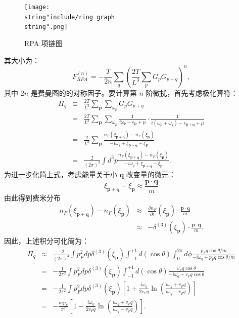 \documentclass[10pt,UTF8]{ctexart}
\begin{document}
\begin{figure}[H]
\begin{centering}
\texttt{[image: \\string"include/ring graph\\string".png]}
\par\end{centering}
\centering{}\caption{RPA 项链图}
\end{figure}
\noindent
其大小为：
\begin{equation}
	F_{RPA}^{\left(n\right)}=-\frac{T}{2n}\sum_{q}\left(\frac{2T}{L^{3}}\sum_{p} G_p G_{p+q} \right)^n,
\end{equation}
其中 $2n$ 是费曼图的的对称因子。要计算第 $n$ 阶微扰，首先考虑极化算符：
\begin{eqnarray}
	\Pi_{q} & \equiv & \frac{2T}{L^{3}}\sum_{\bm{p}}\sum_{\omega_{p}}G_{p}G_{p+q}\\
 	& = & \frac{2T}{L^{3}}\sum_{\bm{p}}\sum_{\omega_{p}}\frac{1}{i\omega_{p}-\epsilon_{\bm{p}}+\mu}\cdot\frac{1}{i\left(\omega_{p}+\omega_{q}\right)-\epsilon_{\bm{p}+\bm{q}}+\mu}\\
 	& = & \frac{2}{L^{3}}\sum_{\bm{p}}\frac{n_{F}\left(\xi_{\bm{p}+\bm{q}}\right)-n_{F}\left(\xi_{\bm{p}}\right)}{-i\omega_{q}+\xi_{\bm{p}+\bm{q}}-\xi_{\bm{p}}}\\
 	& = & \frac{2}{\left(2\pi\right)^{3}}\int d^{3}p\frac{n_{F}\left(\xi_{\bm{p}+\bm{q}}\right)-n_{F}\left(\xi_{\bm{p}}\right)}{-i\omega_{q}+\xi_{\bm{p}+\bm{q}}-\xi_{\bm{p}}}.
\end{eqnarray}
为进一步化简上式，考虑能量关于小 $\bm q$ 改变量的微元：
\begin{equation}
	\xi_{\bm{p}+\bm{q}}-\xi_{\bm{p}} \approx \frac{\bm{p}\cdot\bm{q}}{m}
\end{equation}
由此得到费米分布
\begin{eqnarray}
	n_{F}\left(\xi_{\bm{p}+\bm{q}}\right)-n_{F}\left(\xi_{\bm{p}}\right) 
	& \approx & \frac{\partial n_{F}}{\partial\epsilon}\left(\xi_{\bm{p}}\right)\cdot\frac{\bm{p}\cdot\bm{q}}{m}\\
 	& \approx & -\delta^{\left(3\right)}\left(\xi_{\bm p}\right)\cdot\frac{\bm{p}\cdot\bm{q}}{m}.
\end{eqnarray}
因此，上述积分可化简为：
\begin{eqnarray}
	\Pi_{q} & \approx & \frac{-2}{\left(2\pi\right)^{3}}\int p_{F}^{2}dp\delta^{(3)}(\xi_{\bm p})\int_{-1}^{+1}d\left(\cos\theta\right)\int_{0}^{2\pi}d\phi\frac{p_{F}q\cos\theta/m}{-i\omega_{q}+p_{F}q\cos\theta/m}\\
 	& = & -\frac{1}{2\pi^{2}}\int p_{F}^{2}dp\delta^{(3)}(\xi_{\bm p})\int_{-1}^{+1}d\left(\cos\theta\right)\frac{v_{F}q\cos\theta}{-i\omega_{q}+v_{F}q\cos\theta}\\
 	& = & -\frac{1}{2\pi^{2}}\int p_{F}^{2}dp\delta^{(3)}(\xi_{\bm p})\left[1+\frac{i\omega_{q}}{2v_{F}q}\ln\left(\frac{i\omega_{q}+v_{F}q}{i\omega_{q}-v_{F}q}\right)\right]\\
 	& = & -\frac{mp_{F}}{\pi^{2}}\left[1-\frac{i\omega_{q}}{2v_{F}q}\ln\left(\frac{i\omega_{q}+v_{F}q}{i\omega_{q}-v_{F}q}\right)\right].
\end{eqnarray}
\end{document}
